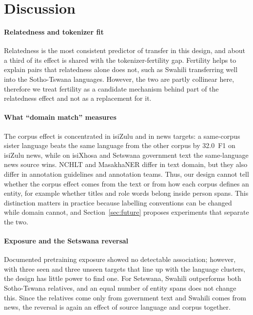\section{Discussion}\label{sec:discussion}

\paragraph{Relatedness and tokenizer fit} Relatedness is the most consistent predictor of transfer in this design, and about a third of its effect is shared with the tokenizer-fertility gap. Fertility helps to explain pairs that relatedness alone does not, such as Swahili transferring well into the Sotho-Tswana languages. However, the two are partly collinear here, therefore we treat fertility as a candidate mechanism behind part of the relatedness effect and not as a replacement for it.

\paragraph{What ``domain match'' measures} The corpus effect is concentrated in isiZulu and in news targets: a same-corpus sister language beats the same language from the other corpus by 32.0~F1 on isiZulu news, while on isiXhosa and Setswana government text the same-language news source wins. NCHLT and MasakhaNER differ in text domain, but they also differ in annotation guidelines and annotation teams. Thus, our design cannot tell whether the corpus effect comes from the text or from how each corpus defines an entity, for example whether titles and role words belong inside person spans. This distinction matters in practice because labelling conventions can be changed while domain cannot, and Section~\ref{sec:future} proposes experiments that separate the two.

\paragraph{Exposure and the Setswana reversal} Documented pretraining exposure showed no detectable association; however, with three seen and three unseen targets that line up with the language clusters, the design has little power to find one. For Setswana, Swahili outperforms both Sotho-Tswana relatives, and an equal number of entity spans does not change this. Since the relatives come only from government text and Swahili comes from news, the reversal is again an effect of source language and corpus together.

